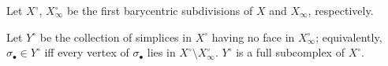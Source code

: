 Let $X^\circ$, $X_\infty^\circ$ be the first barycentric subdivisions of $X$
and $X_\infty$, respectively.

\begin{definition}
  Let $Y^\circ$ be the collection of simplices in $X^\circ$ having no face in
  $X_\infty^\circ$; equivalently, $\sigma_\bullet \in Y^\circ$ iff every vertex of $\sigma_\bullet$
  lies in $X^\circ \setminus X_\infty^\circ$.  $Y^\circ$ is a full subcomplex of $X^\circ$.
\end{definition}






